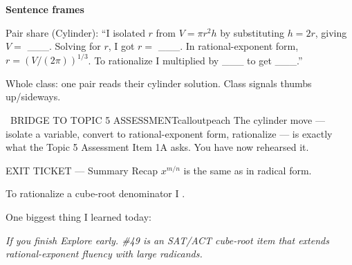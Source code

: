 \documentclass[11pt]{article}
\begin{document}

\begin{sentenceframebox}
\textbf{Sentence frames}

Pair share (Cylinder): ``I isolated \(r\) from \(V = \pi r^2h\) by substituting \(h = 2r\), giving \(V =\) \_\_\_. Solving for \(r\), I got \(r =\) \_\_\_. In rational-exponent form, \(r = (V/(2\pi))^{1/3}\). To rationalize I multiplied by \_\_\_ to get \_\_\_.'' 

Whole class: one pair reads their cylinder solution. Class signals thumbs up/sideways.
\end{sentenceframebox}

\begin{callout}{\IconSearch\ BRIDGE TO TOPIC 5 ASSESSMENT}{calloutpeach}
The cylinder move --- isolate a variable, convert to rational-exponent form, rationalize --- is exactly what the Topic 5 Assessment Item 1A asks. You have now rehearsed it.
\end{callout}


\begin{summaryexitbox}{EXIT TICKET --- Summary Recap}
\(x^{m/n}\) is the same as \blank[1.8in] in radical form.

To rationalize a cube-root denominator I \blank[2.15in].

One biggest thing I learned today: \blank[2.9in]
\end{summaryexitbox}

\clearpage

\textit{If you finish Explore early. \#49 is an SAT/ACT cube-root item that extends rational-exponent fluency with large radicands.}

\end{document}
